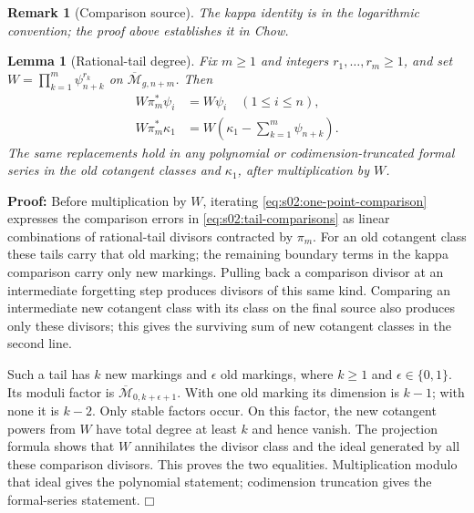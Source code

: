 \documentclass[a4paper,10pt]{article}
\numberwithin{equation}{section}
\newcommand{\MM}{\overline{\mathcal{M}}}
\theoremstyle{paperplain}
\newtheorem{lmm}[thm]{Lemma}
\theoremstyle{paperremark}
\newtheorem{rmk}{Remark}[section]
\theoremstyle{paperplain}
\newenvironment{prf}{\noindent \textbf{Proof: }}{\hfill $\mdlgwhtsquare$\par\addvspace{0.5\baselineskip}}
\begin{document}
\begin{rmk}[Comparison source]
\label{rmk:s02:comparison-source}
The kappa identity is \cite[(2.10)]{KMZ96v1} in the logarithmic
convention; the proof above establishes it in Chow.
\end{rmk}

\begin{lmm}[Rational-tail degree]
\label{lmm:s02:rational-tail-degree}
Fix $m\geq1$ and integers $r_1,\ldots,r_m\geq1$, and set
$W=\prod_{k=1}^m\psi_{n+k}^{r_k}$ on $\MM_{g,n+m}$.  Then
\begin{equation}
\label{eq:s02:tail-comparisons}
\begin{split}
W\pi_m^*\psi_i&=W\psi_i\quad(1\leq i\leq n),\\
W\pi_m^*\kappa_1
&=W\left(\kappa_1-\sum_{k=1}^m\psi_{n+k}\right).
\end{split}
\end{equation}
The same replacements hold in any polynomial or codimension-truncated
formal series in the old cotangent classes and $\kappa_1$, after
multiplication by $W$.
\end{lmm}

\begin{prf}
Before multiplication by $W$, iterating
\eqref{eq:s02:one-point-comparison} expresses the comparison errors
in \eqref{eq:s02:tail-comparisons} as linear combinations of
rational-tail divisors contracted by $\pi_m$.  For an old cotangent
class these tails carry that old marking; the remaining boundary
terms in the kappa comparison carry only new markings.  Pulling back a comparison
divisor at an intermediate forgetting step produces divisors of this
same kind.  Comparing an intermediate new cotangent class with its
class on the final source also produces only these divisors; this
gives the surviving sum of new cotangent classes in the second line.

Such a tail has $k$ new markings and $\epsilon$ old markings, where
$k\geq1$ and $\epsilon\in\{0,1\}$.  Its moduli factor is
$\MM_{0,k+\epsilon+1}$.  With one old marking its dimension is
$k-1$; with none it is $k-2$.  Only stable factors occur.  On this
factor, the new cotangent powers from $W$ have total degree at least
$k$ and hence vanish.  The projection formula shows that $W$
annihilates the divisor class and the ideal generated by all these
comparison divisors.  This proves the two equalities.  Multiplication
modulo that ideal gives the polynomial statement; codimension
truncation gives the formal-series statement.
\end{prf}
\end{document}
